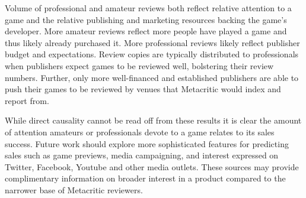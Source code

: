 \documentclass[letterpaper]{article}
\begin{document}


Volume of professional and amateur reviews both reflect relative attention to a game and the relative publishing and marketing resources backing the game's developer. More amateur reviews reflect more people have played a game and thus likely already purchased it.
More professional reviews likely reflect publisher budget and expectations. Review copies are typically distributed to professionals when publishers expect games to be reviewed well, bolstering their review numbers. Further, only more well-financed and established publishers are able to push their games to be reviewed by venues that Metacritic would index and report from.

While direct causality cannot be read off from these results it is clear the amount of attention amateurs or professionals devote to a game relates to its sales success. Future work should explore more sophisticated features for predicting sales such as game previews, media campaigning, and interest expressed on Twitter, Facebook, Youtube and other media outlets. These sources may provide complimentary information on broader interest in a product compared to the narrower base of Metacritic reviewers.
\end{document}
